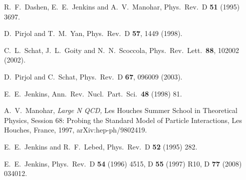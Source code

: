 \documentclass[twocolumn,nofootinbib,prd,aps,superscriptaddress,tightenlines]{revtex4}
\begin{document}
\begin{thebibliography}{99}
  R.~F.~Dashen, E.~E.~Jenkins and A.~V.~Manohar,
  Phys.\ Rev.\  D {\bf 51} (1995) 3697.

  D.~Pirjol and T.~M.~Yan,
  Phys.\ Rev.\  D {\bf 57}, 1449 (1998).

  C.~L.~Schat, J.~L.~Goity and N.~N.~Scoccola,
  Phys.\ Rev.\ Lett.\  {\bf 88}, 102002 (2002).

  D.~Pirjol and C.~Schat,
  Phys.\ Rev.\  D {\bf 67}, 096009 (2003).


  E.~E.~Jenkins,
  Ann.\ Rev.\ Nucl.\ Part.\ Sci.\  {\bf 48} (1998) 81.

  A.~V.~Manohar, {\sl Large N QCD,} Les Houches Summer School in Theoretical Physics, Session 68: Probing the Standard Model of Particle Interactions, Les Houches, France, 1997,
  arXiv:hep-ph/9802419.
  
  E.~E.~Jenkins and R.~F.~Lebed,
  Phys.\ Rev.\  D {\bf 52} (1995) 282.
  
  E.~E.~Jenkins,
  Phys.\ Rev.\  D {\bf 54} (1996) 4515,
D {\bf 55} (1997) R10,
  D {\bf 77} (2008) 034012.



\end{thebibliography}
\end{document}
